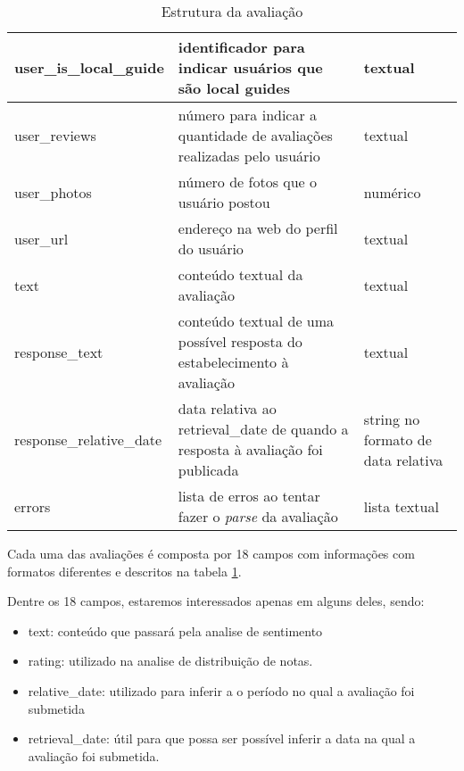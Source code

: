 \begin{table}[]
\begin{tabular}{|l|p{5cm}|p{5cm}|}
		\hline
		user\_is\_local\_guide    & identificador para indicar usuários que são local guides                        & textual                                                                        \\
		\hline
		user\_reviews             & número para indicar a quantidade de avaliações realizadas pelo usuário          & textual                                                                        \\
		\hline
		user\_photos              & número de fotos que o usuário postou                                            & numérico                                                                       \\
		\hline
		user\_url                 & endereço na web do perfil do usuário                                            & textual                                                                        \\
		\hline
		text                      & conteúdo textual da avaliação                                                   & textual                                                                        \\
		\hline
		response\_text            & conteúdo textual de uma possível resposta do estabelecimento à avaliação        & textual                                                                        \\
		\hline
		response\_relative\_date  & data relativa ao retrieval\_date de quando a resposta à avaliação foi publicada & string no formato de data relativa                                             \\
		\hline
		errors                    & lista de erros ao tentar fazer o \emph{parse} da avaliação                      & lista textual                                                                  \\
		\hline
	\end{tabular}
	\caption{Estrutura da avaliação}
	\label{tab:estrutura_review}
\end{table}

Cada uma das avaliações é composta por 18 campos com informações com formatos diferentes e descritos na tabela \ref{tab:estrutura_review}.

Dentre os 18 campos, estaremos interessados apenas em alguns deles, sendo:

\begin{itemize}
	\item text: conteúdo que passará pela analise de sentimento
	\item rating: utilizado na analise de distribuição de notas.
	\item relative\_date: utilizado para inferir a o período no qual a avaliação foi submetida
	\item retrieval\_date: útil para que possa ser possível inferir a data na qual a avaliação foi submetida.
\end{itemize}

